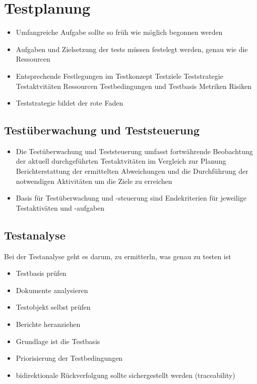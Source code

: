 \documentclass{report}
\theoremstyle{definition}
\theoremstyle{example}
\begin{document}
\section{Testplanung}
\begin{itemize}
   \item Umfangreiche Aufgabe sollte so früh wie möglich begonnen werden
   \item Aufgaben und Zielsetzung der tests müssen festelegt werden, genau wie die Ressourcen
   \item Entsprechende Festlegungen im Testkonzept
   \subitem Testziele
   \subitem Teststrategie
   \subitem Testaktvitäten
   \subitem Ressourcen
   \subitem Testbedingungen und Testbasis
   \subitem Metriken
   \subitem Risiken
   \item Teststrategie bildet der rote Faden 
\end{itemize}

\subsection{Testüberwachung und Teststeuerung}
\begin{itemize}
   \item Die Testüberwachung und Teststeuerung umfasst
   \subitem fortwährende Beobachtung der aktuell durchgeführten Testaktvitäten im Vergleich zur Planung
   \subitem Berichterstattung der ermittelten Abweichungen und die Durchführung der notwendigen Aktivitäten um die Ziele zu erreichen
   \item Basis für Testüberwachung und -steuerung sind Endekriterien für jeweilige Testaktiväten und -aufgaben
\end{itemize}

\subsection{Testanalyse}
Bei der Testanalyse geht es darum, zu ermitterln, was genau zu testen ist
\begin{itemize}
   \item Testbasis prüfen
   \item Dokumente analysieren
   \item Testobjekt selbst prüfen
   \item Berichte heranziehen
   \item Grundlage ist die Testbasis
   \item Priorisierung der Testbedingungen
   \item bidirektionale Rückverfolgung sollte sichergestellt werden (traceability)
\end{itemize}
\end{document}
